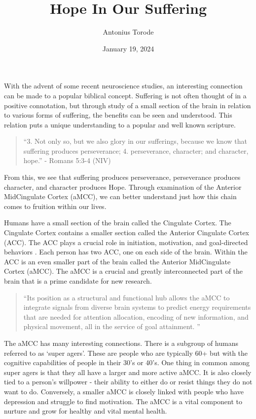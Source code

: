 \documentclass[9.5pt]{article}
\title{Hope In Our Suffering}
\author{Antonius Torode}
\date{January 19, 2024}
\begin{document}
\maketitle
\thispagestyle{fancy}

\begin{multicols}{2}

With the advent of some recent neuroscience studies, an interesting connection can be made to a popular biblical concept. Suffering is not often thought of in a positive connotation, but through study of a small section of the brain in relation to various forms of suffering, the benefits can be seen and understood. This relation puts a unique understanding to a popular and well known scripture.

\begin{quotation}
``3. Not only so, but we also glory in our sufferings, because we know that suffering produces perseverance; 4. perseverance, character; and character, hope.'' - Romans 5:3-4 (NIV)
\end{quotation}

From this, we see that suffering produces perseverance, perseverance produces character, and character produces Hope. Through examination of the Anterior MidCingulate Cortex (aMCC), we can better understand just how this chain comes to fruition within our lives.

Humans have a small section of the brain called the Cingulate Cortex. The Cingulate Cortex contains a smaller section called the Anterior Cingulate Cortex (ACC). The ACC plays a crucial role in initiation, motivation, and goal-directed behaviors \cite{ACC}. Each person has two ACC, one on each side of the brain. Within the ACC is an even smaller part of the brain called the Anterior MidCingulate Cortex (aMCC). The aMCC is a crucial and greatly interconnected part of the brain that is a prime candidate for new research.

\begin{quotation}
``Its position as a structural and functional hub allows the aMCC to integrate signals from diverse brain systems to predict energy requirements that are needed for attention allocation, encoding of new information, and physical movement, all in the service of goal attainment. \cite{aMCC}''
\end{quotation}

The aMCC has many interesting connections. There is a subgroup of humans referred to as `super agers'. These are people who are typically 60+ but with the cognitive capabilities of people in their 30's or 40's. One thing in common among super agers is that they all have a larger and more active aMCC. It is also closely tied to a person's willpower - their ability to either do or resist things they do not want to do. Conversely, a smaller aMCC is closely linked with people who have depression and struggle to find motivation. The aMCC is a vital component to nurture and grow for healthy and vital mental health. 


\end{multicols}
\end{document}
